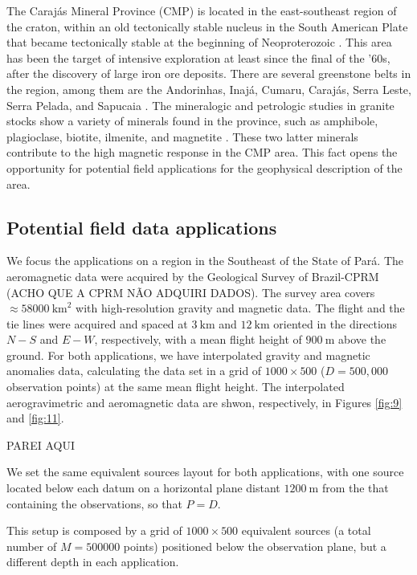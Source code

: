 The Caraj{\'a}s Mineral Province (CMP) is located in the east-southeast region of the craton, within an old tectonically stable nucleus in the 
South American Plate that became tectonically stable at the beginning of Neoproterozoic \citep{salomao-etal2019}. 
This area has been the target of intensive exploration at least since the final of the '60s, after the discovery of large iron ore deposits. 
There are several greenstone belts in the region, among them are the Andorinhas, Inajá, Cumaru, Caraj{\'a}s, Serra Leste, Serra Pelada, and Sapucaia 
\citep{santos-etal2000}. The mineralogic and petrologic studies in granite stocks show a variety of minerals found in the province, such as 
amphibole, plagioclase, biotite, ilmenite, and magnetite \citep{cunha-etal2016}. These two latter minerals contribute to the high magnetic 
response in the CMP area. This fact opens the opportunity for potential field applications for the geophysical description of the area. 

\subsection{Potential field data applications}

We focus the applications on a region in the Southeast of the State of Par{\'a}. 
The aeromagnetic data were acquired by the Geological Survey of Brazil-CPRM (ACHO QUE A CPRM NÃO ADQUIRI DADOS).
The survey area covers $\approx 58000 \: \mathrm{km}^2$ with high-resolution gravity and magnetic data. 
The flight and the tie lines were acquired and spaced at $3 \: \mathrm{km}$  and $12 \: \mathrm{km}$ oriented in the 
directions $N-S$ and $E-W$, respectively, with a mean flight height of $900 \: \mathrm{m}$ above the ground. 
For both applications, we have interpolated gravity and magnetic anomalies data, calculating the data set in a grid of 
$1000 \times 500$ ($D = 500,000$ observation points) at the same mean flight height. 
The interpolated aerogravimetric and aeromagnetic data are shwon, respectively, in Figures \ref{fig:9} and \ref{fig:11}. 

PAREI AQUI

We set the same equivalent sources layout for both applications, with one source located below each datum on a horizontal
plane distant $1200 \: \mathrm{m}$ from the that containing the observations, so that $P=D$.

This setup is composed by a grid of $1000 \times 500$ equivalent sources (a total number of $M = 500000$ points) 
positioned below the observation plane, but a different depth in each application.

